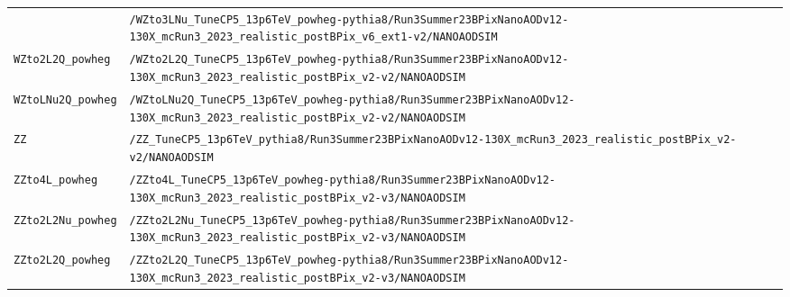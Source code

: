 \begin{longtable}{@{}>{\RaggedRight\arraybackslash}p{} >{\RaggedRight\arraybackslash}p{}@{}}
 & \texttt{/\allowbreak{}WZto3LNu\_\allowbreak{}TuneCP5\_\allowbreak{}13p6TeV\_\allowbreak{}powheg-\allowbreak{}pythia8/\allowbreak{}Run3Summer23BPixNanoAODv12-\allowbreak{}130X\_\allowbreak{}mcRun3\_\allowbreak{}2023\_\allowbreak{}realistic\_\allowbreak{}postBPix\_\allowbreak{}v6\_\allowbreak{}ext1-\allowbreak{}v2/\allowbreak{}NANOAODSIM} \\
\addlinespace[2pt]
\texttt{WZto2L2Q\_\allowbreak{}powheg} & \texttt{/\allowbreak{}WZto2L2Q\_\allowbreak{}TuneCP5\_\allowbreak{}13p6TeV\_\allowbreak{}powheg-\allowbreak{}pythia8/\allowbreak{}Run3Summer23BPixNanoAODv12-\allowbreak{}130X\_\allowbreak{}mcRun3\_\allowbreak{}2023\_\allowbreak{}realistic\_\allowbreak{}postBPix\_\allowbreak{}v2-\allowbreak{}v2/\allowbreak{}NANOAODSIM} \\
\addlinespace[2pt]
\texttt{WZtoLNu2Q\_\allowbreak{}powheg} & \texttt{/\allowbreak{}WZtoLNu2Q\_\allowbreak{}TuneCP5\_\allowbreak{}13p6TeV\_\allowbreak{}powheg-\allowbreak{}pythia8/\allowbreak{}Run3Summer23BPixNanoAODv12-\allowbreak{}130X\_\allowbreak{}mcRun3\_\allowbreak{}2023\_\allowbreak{}realistic\_\allowbreak{}postBPix\_\allowbreak{}v2-\allowbreak{}v2/\allowbreak{}NANOAODSIM} \\
\addlinespace[2pt]
\texttt{ZZ} & \texttt{/\allowbreak{}ZZ\_\allowbreak{}TuneCP5\_\allowbreak{}13p6TeV\_\allowbreak{}pythia8/\allowbreak{}Run3Summer23BPixNanoAODv12-\allowbreak{}130X\_\allowbreak{}mcRun3\_\allowbreak{}2023\_\allowbreak{}realistic\_\allowbreak{}postBPix\_\allowbreak{}v2-\allowbreak{}v2/\allowbreak{}NANOAODSIM} \\
\addlinespace[2pt]
\texttt{ZZto4L\_\allowbreak{}powheg} & \texttt{/\allowbreak{}ZZto4L\_\allowbreak{}TuneCP5\_\allowbreak{}13p6TeV\_\allowbreak{}powheg-\allowbreak{}pythia8/\allowbreak{}Run3Summer23BPixNanoAODv12-\allowbreak{}130X\_\allowbreak{}mcRun3\_\allowbreak{}2023\_\allowbreak{}realistic\_\allowbreak{}postBPix\_\allowbreak{}v2-\allowbreak{}v3/\allowbreak{}NANOAODSIM} \\
\addlinespace[2pt]
\texttt{ZZto2L2Nu\_\allowbreak{}powheg} & \texttt{/\allowbreak{}ZZto2L2Nu\_\allowbreak{}TuneCP5\_\allowbreak{}13p6TeV\_\allowbreak{}powheg-\allowbreak{}pythia8/\allowbreak{}Run3Summer23BPixNanoAODv12-\allowbreak{}130X\_\allowbreak{}mcRun3\_\allowbreak{}2023\_\allowbreak{}realistic\_\allowbreak{}postBPix\_\allowbreak{}v2-\allowbreak{}v3/\allowbreak{}NANOAODSIM} \\
\addlinespace[2pt]
\texttt{ZZto2L2Q\_\allowbreak{}powheg} & \texttt{/\allowbreak{}ZZto2L2Q\_\allowbreak{}TuneCP5\_\allowbreak{}13p6TeV\_\allowbreak{}powheg-\allowbreak{}pythia8/\allowbreak{}Run3Summer23BPixNanoAODv12-\allowbreak{}130X\_\allowbreak{}mcRun3\_\allowbreak{}2023\_\allowbreak{}realistic\_\allowbreak{}postBPix\_\allowbreak{}v2-\allowbreak{}v3/\allowbreak{}NANOAODSIM} \\

\end{longtable}
